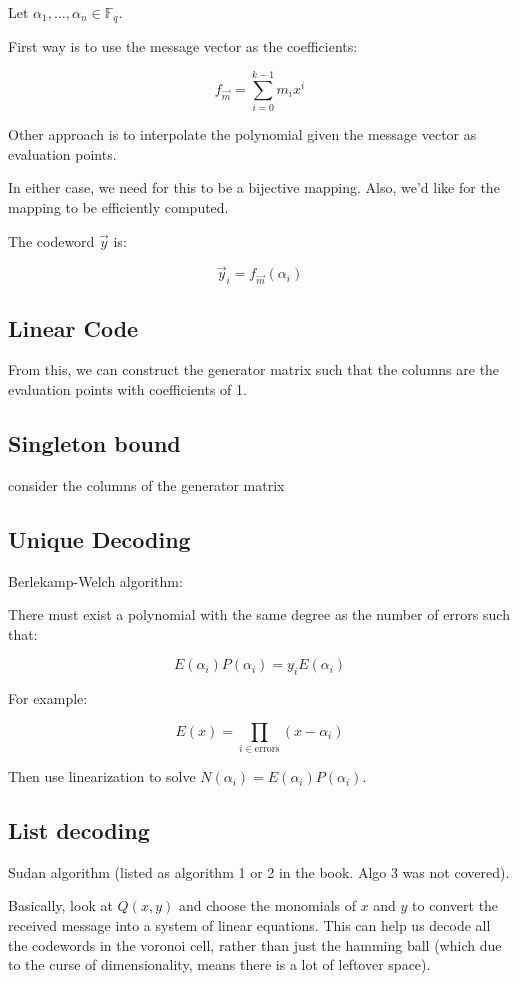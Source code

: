 \documentclass{idc_msc}
\newcommand{\Fq}[1][q]{{\mathbb{F}_{#1}}}
\begin{document}
Let \(\alpha_1,\ldots,\alpha_n \in \Fq\).

First way is to use the message vector as the coefficients:

\[f_{\vec{m}} = \sum_{i=0}^{k-1} m_i x^i\]

Other approach is to interpolate the polynomial given the message vector as evaluation points.

In either case, we need for this to be a bijective mapping.
Also, we'd like for the mapping to be efficiently computed.

The codeword \(\vec{y}\) is:

\[\vec{y}_i = f_{\vec{m}}(\alpha_i)\]

\subsection{Linear Code}

From this, we can construct the generator matrix such that the columns are the evaluation points with coefficients of 1.

\subsection{Singleton bound}

consider the columns of the generator matrix

\subsection{Unique Decoding}

Berlekamp-Welch algorithm:

There must exist a polynomial with the same degree as the number of errors such that:

\[E(\alpha_i)P(\alpha_i) = y_i E(\alpha_i)\]

For example:

\[E(x) = \prod_{i\in \text{errors}} (x - \alpha_i)\]

Then use linearization to solve \(N(\alpha_i) = E(\alpha_i)P(\alpha_i)\).

\subsection{List decoding}

Sudan algorithm (listed as algorithm 1 or 2 in the book. Algo 3 was not covered).

Basically, look at \(Q(x,y)\) and choose the monomials of \(x\) and \(y\) to convert the received message into a system of linear equations.
This can help us decode all the codewords in the voronoi cell, rather than just the hamming ball (which due to the curse of dimensionality, means there is a lot of leftover space).
\end{document}
